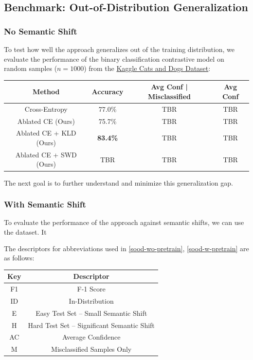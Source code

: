 \documentclass{article}
\theoremstyle{plain}
\theoremstyle{definition}
\theoremstyle{remark}
\begin{document}
\subsection{Benchmark: Out-of-Distribution Generalization}

\subsubsection{No Semantic Shift}
To test how well the approach generalizes out of the training distribution, we evaluate the performance of the binary classification contrastive model on random samples ($n=1000$) from the \href{https://www.microsoft.com/en-us/download/details.aspx?id=54765}{Kaggle Cats and Dogs Dataset}:
\begin{table}[h]
	\centering
	\begin{tabular}{c|ccc}
		\toprule
		\textbf{Method} & \textbf{Accuracy} & \textbf{Avg Conf | Misclassified} & \textbf{Avg Conf} \\
		\midrule
		Cross-Entropy 		& 77.0\% 	& TBR & TBR \\
		Ablated CE (Ours) 	& 75.7\% 	& TBR & TBR \\
		Ablated CE + KLD (Ours) & \bf 83.4\% 	& TBR & TBR \\
		Ablated CE + SWD (Ours) & TBR & TBR & TBR \\
		\bottomrule
	\end{tabular}
\end{table}

The next goal is to further understand and minimize this generalization gap.

\subsubsection{With Semantic Shift}

To evaluate the performance of the approach against semantic shifts, we can use the \citet{soodimagenet} dataset. It 

The descriptors for abbreviations used in \ref{sood-wo-pretrain}, \ref{sood-w-pretrain} are as follows:
\begin{table}[h]
	\centering
	\begin{tabular}{c|c}
		\toprule
		\textbf{Key} & \textbf{Descriptor} \\
		\midrule
		F1 & F-1 Score \\
		ID & In-Distribution \\ 
		E & Easy Test Set -- Small Semantic Shift \\
		H & Hard Test Set -- Significant Semantic Shift \\
		AC & Average Confidence \\
		M & Misclassified Samples Only \\
		\bottomrule
	\end{tabular}
\end{table}
\end{document}
